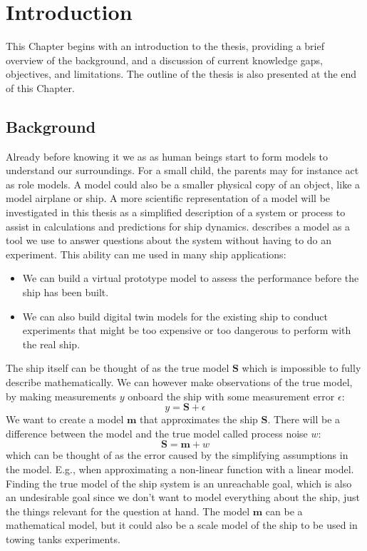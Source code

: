 \chapter{Introduction}
This Chapter begins with an introduction to the thesis, providing a brief overview of the background, and a discussion of current knowledge gaps, objectives, and limitations. The outline of the thesis is also presented at the end of this Chapter.

\section{Background}
Already before knowing it we as as human beings start to form models to understand our surroundings. For a small child, the parents may for instance act as role models. A model could also be a smaller physical copy of an object, like a model airplane or ship. A more scientific representation of a model will be investigated in this thesis as a simplified description of a system or process to assist in calculations and predictions for ship dynamics.
\textcite{ljung_modeling_2021} describes a model as a tool we use to answer questions about the system without having to do an experiment. This ability can me used in many ship applications:
\vspace{0.3cm}
\begin{itemize}
    \item We can build a virtual prototype model to assess the performance before the ship has been built.
    \item We can also build digital twin models for the existing ship to conduct experiments that might be too expensive or too dangerous to perform with the real ship.
\end{itemize}
\vspace{0.3cm}
The ship itself can be thought of as the true model $\mathbf{S}$ which is impossible to fully describe mathematically. We can however make observations of the true model, by making measurements $y$ onboard the ship with some measurement error $\epsilon$:
$$
y = \mathbf{S} + \epsilon
$$
We want to create a model $\mathbf{m}$ that approximates the ship $\mathbf{S}$. There will be a difference between the model and the true model called process noise $w$:
$$
\mathbf{S} = \mathbf{m} + w
$$
which can be thought of as the error caused by the simplifying assumptions in the model. E.g., when approximating a non-linear function with a linear model.
Finding the true model of the ship system is an unreachable goal, which is also an undesirable goal since we don't want to model everything about the ship, just the things relevant for the question at hand. The model $\mathbf{m}$ can be a mathematical model, but it could also be a scale model of the ship to be used in towing tanks experiments.

